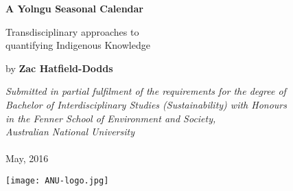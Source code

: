 \begin{titlepage}
    \begin{center}
        \vspace*{1cm}
                
        \Huge
        \textbf{A Yolngu Seasonal Calendar}
        
        \vspace{1cm}
        \Large
        Transdisciplinary approaches to\\
        quantifying Indigenous Knowledge
        
        \vspace{1.5cm}
        
        by \textbf{Zac Hatfield-Dodds}
        
        \vfill
        
        \large \textit{
        Submitted in partial fulfilment of the requirements for the degree of\\
        Bachelor of Interdisciplinary Studies (Sustainability) with Honours\\
        in the Fenner School of Environment and Society,\\
        Australian National University\\
        }~\\
        May, 2016
        
        \vspace{1.5cm}
        
        \texttt{[image: ANU-logo.jpg]}
        
    \end{center}
\end{titlepage}
